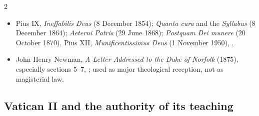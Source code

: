 \begin{multicols}{2}
{\begin{itemize}[itemsep=0.1em,topsep=0.15em]
\item Pius IX, \emph{Ineffabilis Deus} (8 December 1854); \emph{Quanta cura} and the \emph{Syllabus} (8 December 1864); \emph{Aeterni Patris} (29 June 1868); \emph{Postquam Dei munere} (20 October 1870). Pius XII, \emph{Munificentissimus Deus} (1 November 1950), .
\item John Henry Newman, \emph{A Letter Addressed to the Duke of Norfolk} (1875), especially sections 5--7, ; used as major theological reception, not as magisterial law.
\end{itemize}}

\subsection*{Vatican II and the authority of its teaching}


\end{multicols}
